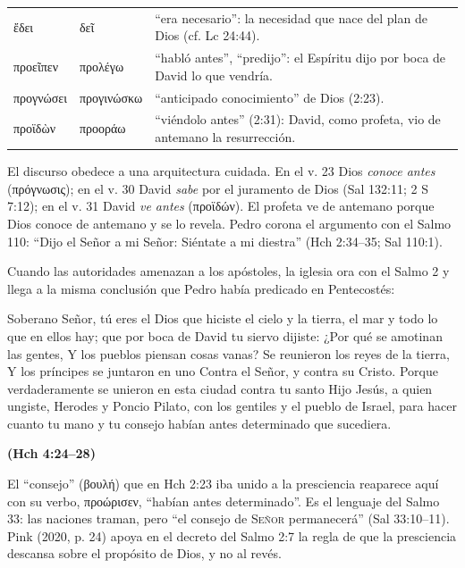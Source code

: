 \documentclass[11pt,letterpaper]{article}
\newcommand{\grc}[1]{\foreignlanguage{ancientgreek}{#1}}
\newcommand{\SENOR}{\textsc{Señor}}
\newcommand{\fuente}[1]{\par\hfill{\upshape\bfseries\small\textcolor{azul}{#1}}}
\begin{document}
\begin{filologia}[Hch 1:16; 2:23, 31]
\begin{tabular}{@{}L{3.2cm}L{1.6cm}L{10cm}@{}}
\grc{ἔδει} & \grc{δεῖ} & ``era necesario'': la necesidad que nace del plan de Dios (cf. Lc 24:44). \\[2pt]
\grc{προεῖπεν} & \grc{προλέγω} & ``habló antes'', ``predijo'': el Espíritu dijo por boca de David lo que vendría. \\[2pt]
\grc{προγνώσει} & \grc{προγινώσκω} & ``anticipado conocimiento'' de Dios (2:23). \\[2pt]
\grc{προϊδὼν} & \grc{προοράω} & ``viéndolo antes'' (2:31): David, como profeta, vio de antemano la resurrección. \\
\end{tabular}
\end{filologia}

El discurso obedece a una arquitectura cuidada. En el v. 23 Dios \emph{conoce antes} (\grc{πρόγνωσις}); en el v. 30 David \emph{sabe} por el juramento de Dios (Sal 132:11; 2 S 7:12); en el v. 31 David \emph{ve antes} (\grc{προϊδών}). El profeta ve de antemano porque Dios conoce de antemano y se lo revela. Pedro corona el argumento con el Salmo 110: ``Dijo el Señor a mi Señor: Siéntate a mi diestra'' (Hch 2:34--35; Sal 110:1).

Cuando las autoridades amenazan a los apóstoles, la iglesia ora con el Salmo 2 y llega a la misma conclusión que Pedro había predicado en Pentecostés:

\begin{cita}Soberano Señor, tú eres el Dios que hiciste el cielo y la tierra, el mar y todo lo que en ellos hay; que por boca de David tu siervo dijiste: ¿Por qué se amotinan las gentes, Y los pueblos piensan cosas vanas? Se reunieron los reyes de la tierra, Y los príncipes se juntaron en uno Contra el Señor, y contra su Cristo. Porque verdaderamente se unieron en esta ciudad contra tu santo Hijo Jesús, a quien ungiste, Herodes y Poncio Pilato, con los gentiles y el pueblo de Israel, para hacer cuanto tu mano y tu consejo habían antes determinado que sucediera.\fuente{(Hch 4:24--28)}\end{cita}

El ``consejo'' (\grc{βουλή}) que en Hch 2:23 iba unido a la presciencia reaparece aquí con su verbo, \grc{προώρισεν}, ``habían antes determinado''. Es el lenguaje del Salmo 33: las naciones traman, pero ``el consejo de \SENOR{} permanecerá'' (Sal 33:10--11). Pink (2020, p. 24) apoya en el decreto del Salmo 2:7 la regla de que la presciencia descansa sobre el propósito de Dios, y no al revés.
\end{document}
